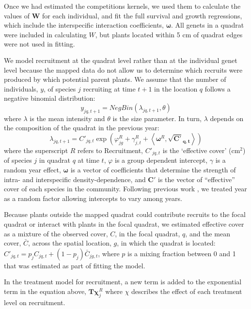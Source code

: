 \documentclass[11pt]{article}
\begin{document}
\begin{doublespacing}
Once we had estimated the competitions kernels, we used them to calculate the values of $\boldsymbol{W}$ for each individual, and fit the full survival and growth regressions, which include the interspecific interaction coefficients, $\boldsymbol{\omega}$. 
All genets in a quadrat were included in calculating $W$, but plants located within 5 cm of quadrat edges were not used in fitting. 

We model recruitment at the quadrat level rather than at the individual genet level because the mapped data do not allow us to determine which recruits were produced by which potential parent plants. We assume that the number of individuals, $y$, of species $j$ recruiting at time $t+1$ in the location $q$ follows a negative binomial distribution:
\begin{equation}
y_{jq,t+1}= NegBin(\lambda_{jq,t+1},\theta) 	   
\label{eqn:recrDataModel}
\end{equation}
where $\lambda$ is the mean intensity and $\theta$ is the size parameter. In turn, $\lambda$ depends on the composition of the quadrat in the previous year:
\begin{equation}
\lambda_{jq,t+1} = C'_{jq,t} \exp{\left(\varphi_{jg}^R + \gamma_{j,t}^R + 
\left \langle \boldsymbol{\omega}^R , \boldsymbol{\sqrt{C'}_{q,t}} \right \rangle \right) }
\label{eqn:recrProcessModel}
\end{equation}
where the superscript $R$ refers to Recruitment, $C'_{jq,t}$ is the `effective cover' (cm$^2$) of species $j$ in quadrat $q$ at time $t$, $\varphi$ is a group dependent intercept, $\gamma$ is a random year effect, $\boldsymbol{\omega}$ is a vector of coefficients that determine the strength of intra- and interspecific density-dependence, and $\boldsymbol{C'}$ is the vector of ``effective'' cover of each species in the community. Following previous work \citep{adler_coexistence_2010}, we treated year as a random factor allowing intercepts to vary among years. 
   
Because plants outside the mapped quadrat could contribute recruits to the focal quadrat or interact with plants in the focal quadrat, we estimated effective cover as a mixture of the observed cover, $C$, in the focal quadrat, $q$, and the mean cover, $\bar{C}$, across the spatial location, $g$, in which the quadrat is located: $C'_{jq,t}=p_j C_{jq,t}+(1-p_j) \bar{C}_{jg,t}$, where $p$ is a mixing fraction between 0 and 1 that was estimated as part of fitting the model.

In the treatment model for recruitment, a new term is added to the exponential term in the equation above, $\boldsymbol{T}\boldsymbol{\chi}_{j}^R$ where $\chi$ describes the effect of each treatment level on recruitment.


\end{doublespacing}
\end{document}

